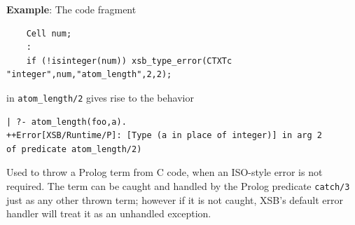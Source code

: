 \begin{description}
{\bf Example}: The code fragment
%
\begin{verbatim}
    Cell num;
    : 
    if (!isinteger(num)) xsb_type_error(CTXTc "integer",num,"atom_length",2,2);
\end{verbatim}
in {\tt atom\_length/2} gives rise to the behavior
%
\begin{verbatim}
| ?- atom_length(foo,a).
++Error[XSB/Runtime/P]: [Type (a in place of integer)] in arg 2 
of predicate atom_length/2)
\end{verbatim}


%
Used to throw a Prolog term from C code, when an ISO-style error is
not required.  The term can be caught and handled by the Prolog
predicate {\tt catch/3} just as any other thrown term; however if it
is not caught, XSB's default error handler will treat it as an
unhandled exception.

\end{description}

